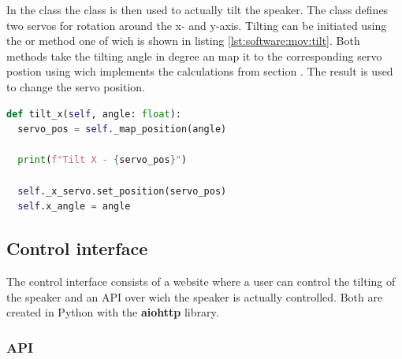 %
In the class  the  class is then used to actually tilt the speaker. The class defines two servos for rotation around the x- and y-axis. Tilting can be initiated using the  or  method one of wich is shown in listing \ref{lst:software:mov:tilt}. Both methods take the tilting angle in degree an map it to the corresponding servo postion using  wich implements the calculations from section . The result is used to change the servo position.
%
\begin{mdframed}
\begin{lstlisting}[language=python, caption=Method for titling the speaker around the x-axis, label=lst:software:mov:tilt]
def tilt_x(self, angle: float):
  servo_pos = self._map_position(angle)

  print(f"Tilt X - {servo_pos}")

  self._x_servo.set_position(servo_pos)
  self.x_angle = angle
\end{lstlisting}
\end{mdframed}

\subsection{Control interface}
%
The control interface consists of a website where a user can control the tilting of the speaker and an API over wich the speaker is actually controlled. Both are created in Python with the \textbf{aiohttp} library.\cite{noauthor_aiohttp_nodate}

\subsubsection*{API}

